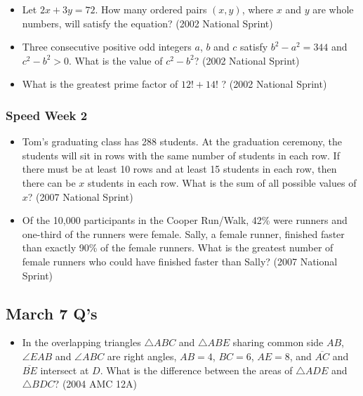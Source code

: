 \documentclass{article}
\begin{document}
\begin{itemize}
\begin{itemize}
\item Let $2x+3y=72$. How many ordered pairs $(x,y)$, where $x$ and $y$ are whole numbers, will satisfy the equation? (2002 National Sprint)

\item Three consecutive positive odd integers $a$, $b$ and $c$ satisfy $b^2-a^2=344$ and $c^2-b^2>0$. What is the value of $c^2-b^2$? (2002 National Sprint)

\item What is the greatest prime factor of $12!+14!$ ? (2002 National Sprint)

\end{itemize}

\subsubsection{Speed Week 2}

\begin{itemize}
\item Tom's graduating class has 288 students. At the graduation ceremony, the students will sit in rows with the same number of students in each row. If there must be at least 10 rows and at least 15 students in each row, then there can be $x$ students in each row. What is the sum of all possible values of $x$? (2007 National Sprint)

\item Of the 10,000 participants in the Cooper Run/Walk, 42\% were runners and one-third of the runners were female. Sally, a female runner, finished faster than exactly 90\% of the female runners. What is the greatest number of female runners who could have finished faster than Sally? (2007 National Sprint)




\end{itemize}

\subsection{March 7 Q's}

\begin{itemize}

\item In the overlapping triangles $\triangle{ABC}$ and $\triangle{ABE}$ sharing common side $AB$, $\angle{EAB}$ and $\angle{ABC}$ are right angles, $AB=4$, $BC=6$, $AE=8$, and $\overline{AC}$ and $\overline{BE}$ intersect at $D$. What is the difference between the areas of $\triangle{ADE}$ and $\triangle{BDC}$? (2004 AMC 12A)


\end{itemize}
\end{itemize}
\end{document}
